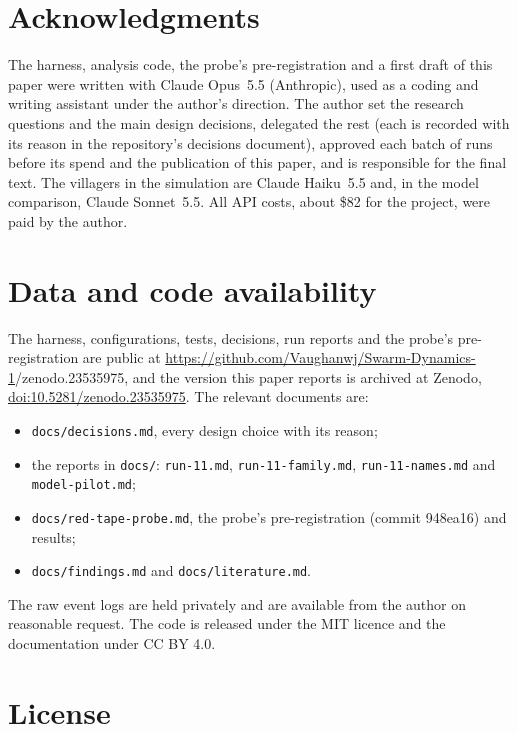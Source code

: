 \documentclass[11pt]{article}
\newcommand{\SOFTWAREDOI}{10.5281/zenodo.23535975}
\begin{document}
\section*{Acknowledgments}

The harness, analysis code, the probe's pre-registration and a first draft of this paper were written
with Claude Opus~5.5 (Anthropic), used as a coding and writing assistant under the author's direction.
The author set the research questions and the main design decisions, delegated the rest (each is
recorded with its reason in the repository's decisions document), approved each batch of runs before
its spend and the publication of this paper, and is responsible for the final text. The
villagers in the simulation are Claude Haiku~5.5 and, in the model comparison, Claude Sonnet~5.5. All
API costs, about \$82 for the project, were paid by the author.

\section*{Data and code availability}

The harness, configurations, tests, decisions, run reports and the probe's pre-registration are public
at \url{https://github.com/Vaughanwj/Swarm-Dynamics-1}\ifx\SOFTWAREDOI\empty\else, and the version this
paper reports is archived at Zenodo, \href{https://doi.org/\SOFTWAREDOI}{doi:\SOFTWAREDOI}\fi. The
relevant documents are:
\begin{itemize}
  \item \texttt{docs/decisions.md}, every design choice with its reason;
  \item the reports in \texttt{docs/}: \texttt{run-11.md}, \texttt{run-11-family.md},
  \texttt{run-11-names.md} and \texttt{model-pilot.md};
  \item \texttt{docs/red-tape-probe.md}, the probe's pre-registration (commit 948ea16) and results;
  \item \texttt{docs/findings.md} and \texttt{docs/literature.md}.
\end{itemize}
The raw event logs are held privately and are available from the author on reasonable request. The
code is released under the MIT licence and the documentation under CC BY 4.0.

\section*{License}

\doclicenseThis



\end{document}
